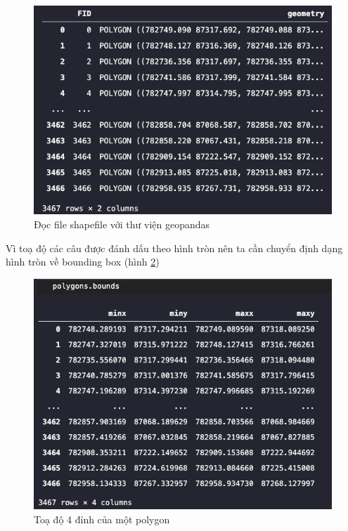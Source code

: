 \documentclass[a4paper, 12pt]{report}
\begin{document}
\begin{enumerate}[label= \textit{\alph*)}]
 \begin{figure}[!h]
	\centering
	\includegraphics[width=1\linewidth]{Images/polygon_ori}
	\caption{Đọc file shapefile với thư viện geopandas}
	\label{fig:polygon_ori}
\end{figure}
Vì toạ độ các câu được đánh dấu theo hình tròn nên ta cần chuyển định dạng hình tròn về bounding box (hình \ref{fig:polygon_bounds})

 \begin{figure}[!h]
	\centering
	\includegraphics[width=1\linewidth]{Images/polygon_bounds}
	\caption{Toạ độ 4 đỉnh của một polygon}
	\label{fig:polygon_bounds}
\end{figure}



\end{enumerate}
\end{document}
